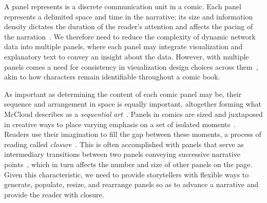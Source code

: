 A panel represents is a discrete communication unit in a comic. 
Each panel represents a delimited space and time in the narrative; its size and information density dictates the duration of the reader's attention and affects the pacing of the narration~\cite{caldwell2012comic,duncan2000toward,duncan2015power}. 
We therefore need to reduce the complexity of dynamic network data into multiple panels, where each panel may integrate visualization and explanatory text to convey an insight about the data. 
However, with multiple panels comes a need for consistency in visualization design choices across them~\cite{qu2018keeping}, akin to how characters remain identifiable throughout a comic book.



As important as determining the content of each comic panel may be, their sequence and arrangement in space is equally important, altogether forming what McCloud describes as a \textit{sequential art}~\cite{mccloud1993understanding}. 
Panels in comics are sized and juxtaposed in creative ways to place varying emphasis on a set of isolated moments~\cite{mccloud1993understanding,eisner2008comics}. 
Readers use their imagination to fill the gap between these moments, a process of reading called \textit{closure}~\cite{mccloud1993understanding, duncan2015power}. 
This is often accomplished with panels that serve as intermediary transitions between two panels conveying successive narrative points~\cite{caldwell2012comic}, which in turn affects the number and size of other panels on the page. 
Given this characteristic, we need to provide storytellers with flexible ways to generate, populate, resize, and rearrange panels so as to advance a narrative and provide the reader with closure.

